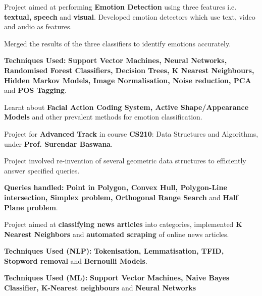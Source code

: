 \documentclass[a4paper]{norm-resume} %
\begin{document}
	\vspace{2mm}
	
	   
	\begin{tightitemize}
	\small
	{
	\item Project aimed at performing \textbf{Emotion Detection} using three features i.e. \textbf{textual, speech} and \textbf{visual}. Developed emotion detectors which use text, video and audio as features.
	\item Merged the results of the three classifiers to identify emotions accurately.
	\item \textbf{Techniques Used:} \textbf{Support Vector Machines, Neural Networks, Randomised Forest Classifiers, Decision Trees, K Nearest Neighbours, Hidden Markov Models, Image Normalisation, Noise reduction, PCA} and \textbf{POS Tagging}.
	\item Learnt about \textbf{Facial Action Coding System,
Active Shape/Appearance Models} and other prevalent methods for emotion classification.
	}
	\end{tightitemize}
		
	\vspace{2mm}
	
	   \descript{Sep '14 - Nov '14}
	\begin{tightitemize}
	\small
	{
	\item Project for \textbf{Advanced Track} in course \textbf{CS210}: Data Structures and Algorithms, under \textbf{Prof. Surendar Baswana}.
	\item Project involved re-invention of several geometric data structures to efficiently answer specified queries.	
	\item \textbf{Queries handled:} \textbf{Point in Polygon, Convex Hull, Polygon-Line intersection, Simplex problem, Orthogonal Range Search} and \textbf{Half Plane problem}.
	}
	\end{tightitemize}
 		
	\vspace{2mm}
		
	   \descript{Jan '14 - Apr '14}
	\begin{tightitemize}
	\small
	{
	\item Project aimed at \textbf{classifying news articles} into categories, implemented \textbf{K Nearest Neighbors} and \textbf{automated scraping} of online news articles.
	\item \textbf{Techniques Used (NLP):} \textbf{Tokenisation, Lemmatisation, TFID, Stopword removal} and \textbf{Bernoulli Models}.
	\item \textbf{Techniques Used (ML):} \textbf{Support Vector Machines, Naive Bayes Classifier, K-Nearest neighbours} and \textbf{Neural Networks}
	}
	\end{tightitemize}
 		
\end{document}
